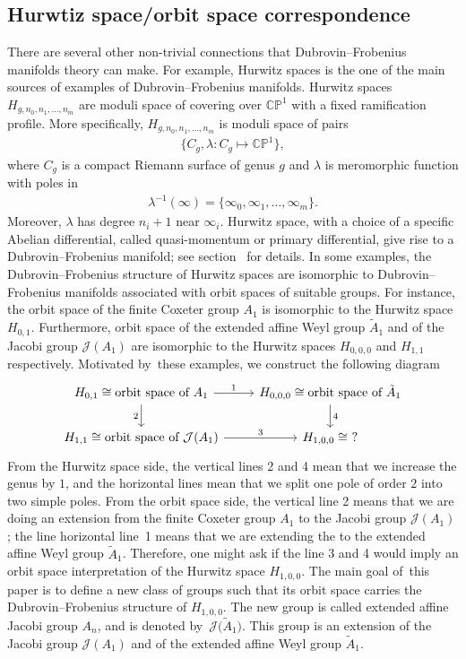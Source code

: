 \documentclass[10pt,a4paper]{amsart}
\numberwithin{equation}{section}
\newcommand{\Ja}{\mathcal{J}}
\begin{document}
\subsection{Hurwtiz space/orbit space correspondence}
There are several other non-trivial connections that Dubrovin--Frobenius manifolds theory can make. For example, Hurwitz spaces is the one of the main sources of examples of Dubrovin--Frobenius manifolds. Hurwitz spaces $H_{g,n_0,n_1,\dots,n_m}$ are moduli space of covering over $\mathbb{CP}^1$ with a fixed ramification profile. More specifically, $H_{g,n_0,n_1,\dots,n_m}$ is moduli space of pairs
\begin{gather*}
\big\{C_g ,\lambda\colon C_g\mapsto \mathbb{CP}^1\big\},
\end{gather*}
where $C_g$ is a compact Riemann surface of genus $g$ and $\lambda$ is meromorphic function with poles in
\begin{gather*}
\lambda^{-1}(\infty)=\{\infty_0,\infty_1,\dots,\infty_{m} \}.
\end{gather*}
 Moreover, $\lambda$ has degree $n_i+1$ near $\infty_i$. Hurwitz space, with a choice of a specific Abelian differential, called quasi-momentum or primary differential, give rise to a Dubrovin--Frobenius manifold; see section~\cite{B.Dubrovin2, V.Shramchenko} for details. In some examples, the Dubrovin--Frobenius structure of Hurwitz spaces are isomorphic to Dubrovin--Frobenius manifolds associated with orbit spaces of suitable groups. For instance, the orbit space of the finite Coxeter group $A_1$ is isomorphic to the Hurwitz space $H_{0,1}$. Furthermore, orbit space of the extended affine Weyl group $\tilde A_1$ and of the Jacobi group $\Ja(A_1)$ are isomorphic to the Hurwitz spaces $H_{0,0,0}$ and $H_{1,1}$ respectively. Motivated by~these examples, we construct the following diagram
\[
 \begin{tikzcd}
 H_{0,1}\cong \text{orbit space of $A_1$} \arrow{r}{1} \arrow[swap]{d}{2} & H_{0,0,0}\cong \text{orbit space of $\tilde A_1$} \arrow{d}{4} \\%
H_{1,1}\cong \text{orbit space of $\Ja(A_1)$} \arrow{r}{3}& H_{1,0,0}\cong\ ?
 \end{tikzcd}
\]
From the Hurwitz space side, the vertical lines 2 and 4 mean that we increase the genus by $1$, and the horizontal lines mean that we split one pole of order $2$ into two simple poles. From the orbit space side, the vertical line 2 means that we are doing an extension from the finite Coxeter group $A_1$ to the Jacobi group $\Ja(A_1)$; the line horizontal line~1 means that we are extending the  to the extended affine Weyl group $\tilde A_1$. Therefore, one might ask if the line 3 and 4 would imply an orbit space interpretation of the Hurwitz space $H_{1,0,0}$. The main goal of~this paper is to define a new class of groups such that its orbit space carries the Dubrovin--Frobenius structure of $H_{1,0,0}$. The new group is called extended affine Jacobi group $A_n$, and is denoted by~$\Ja\big(\tilde A_1\big)$. This group is an extension of the Jacobi group $\Ja(A_1)$ and of the extended affine Weyl group $\tilde A_1$.
\end{document}

